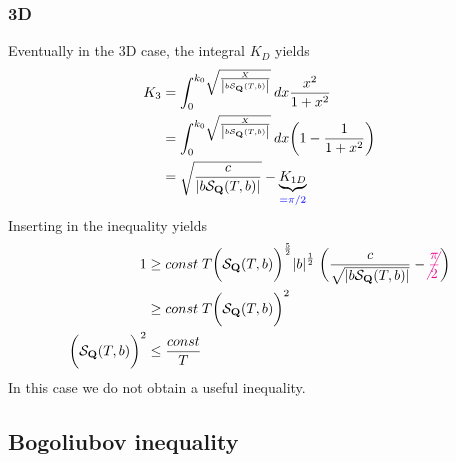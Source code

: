 \subsubsection{3D}
%
Eventually in the 3D case, the integral $K_{D}$ yields
%
\begin{align*}
K_{3} &= \int_{0}^{k_{0}\sqrt{\frac{X }{   \abs{b {\cal S}_{\mathbf Q}(T,b)}}} }dx 
   \frac{x^{2}}{1 +  x^{2}}\\
    &= \int_{0}^{k_{0}\sqrt{\frac{X }{   \abs{b {\cal S}_{\mathbf Q}(T,b)}}} } dx 
\bigg(   1-\frac{1}{1 +  x^{2}}\bigg)\\
&=\sqrt{\frac{c}{ \abs{b {\cal S}_{\mathbf Q}(T,b)}}}  -\underbrace{
 K_{1D}
}_{\color{blue} = \pi/2}
\end{align*}
%
Inserting in the inequality  yields
%
\begin{align*}
1&\ge const \;T 
\bigg({\cal S}_{\mathbf Q}(T,b)\bigg)^{\frac{5}{2}}
  \abs{b}^{\frac{1}{2}}
    \;
    \bigg(\frac{c}{\sqrt{  \abs{b {\cal S}_{\mathbf Q}(T,b)}}}  - {\color{magenta} \cancel{\frac{\pi}{2}}}  \bigg)\\
&    \ge const \;T 
\bigg({\cal S}_{\mathbf Q}(T,b)\bigg)^{2}\\
\bigg({\cal S}_{\mathbf Q}(T,b)\bigg)^{2} &\le  \frac{const}{T}
\end{align*}
%
In this case we do not obtain  a useful inequality. 



\subsection{Bogoliubov inequality }\label{app:Bogoliubov}

